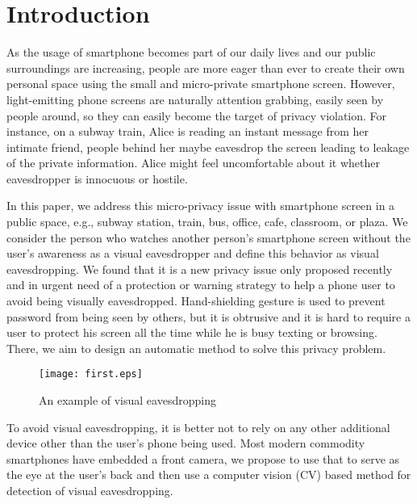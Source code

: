 
\section{Introduction}


As the usage of smartphone becomes part of our daily lives and our public surroundings are increasing, people are more eager than ever to create their own personal space using the small and micro-private smartphone screen.  However, light-emitting phone screens are naturally attention grabbing, easily seen by  people around, so they can easily become the target of privacy violation.
For instance,  on a subway train,  Alice is reading an instant message from her intimate friend, people behind her maybe eavesdrop the screen leading to leakage of the private information. Alice might feel uncomfortable about it whether eavesdropper is innocuous or hostile.


In this paper, we address this micro-privacy issue with  smartphone screen in a public space, e.g., subway station, train, bus, office, cafe,  classroom, or plaza.  We consider  the person who watches another person's smartphone screen without the user's awareness as a visual eavesdropper and define this behavior as  visual eavesdropping.
We found that it is a new  privacy issue only proposed recently and in urgent need of  a protection  or warning strategy to help a phone user to avoid being visually eavesdropped.  Hand-shielding gesture is used to prevent password from being seen by others\cite{yan2013designing}, but it is obtrusive and it is hard to require a user to protect his screen all the time while he is busy texting or browsing. There, we aim to design an automatic method to solve this privacy problem.
\begin{figure}[!htb]
\centering
\texttt{[image: first.eps]}
\caption{An example of visual eavesdropping}
\label{fig:motivation}
\end{figure}

To avoid visual eavesdropping, it is better not to rely on any other additional device other than the user's phone being used. 
Most modern commodity smartphones  have embedded a front camera, we propose to use that to serve as the eye at the user's back and then use a computer vision (CV) based method for detection of visual eavesdropping. 



